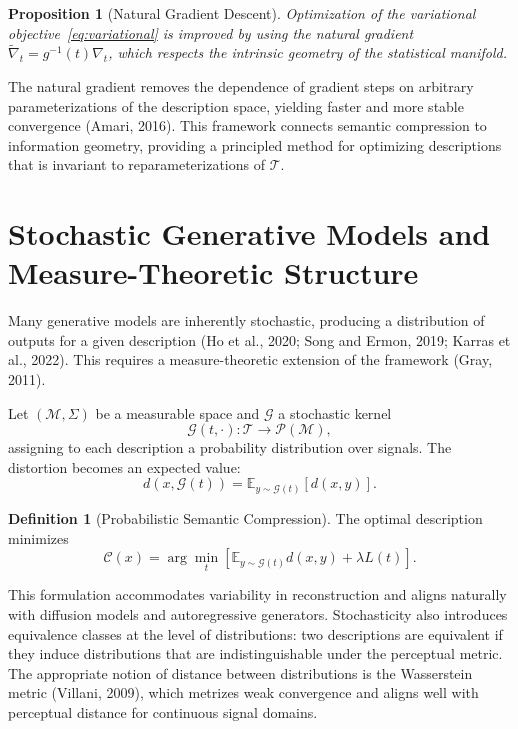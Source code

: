 \documentclass[11pt,a4paper]{article}
\newtheorem{proposition}[theorem]{Proposition}
\theoremstyle{definition}
\newtheorem{definition}[theorem]{Definition}
\theoremstyle{remark}
\begin{document}
\begin{proposition}[Natural Gradient Descent]
Optimization of the variational objective~\eqref{eq:variational} is improved by using the natural gradient $\tilde{\nabla}_t = g^{-1}(t) \nabla_t$, which respects the intrinsic geometry of the statistical manifold.
\end{proposition}

The natural gradient removes the dependence of gradient steps on arbitrary parameterizations of the description space, yielding faster and more stable convergence (Amari, 2016). This framework connects semantic compression to information geometry, providing a principled method for optimizing descriptions that is invariant to reparameterizations of $\mathcal{T}$.

\section{Stochastic Generative Models and Measure-Theoretic Structure}
\label{sec:stochastic}

Many generative models are inherently stochastic, producing a distribution of outputs for a given description (Ho et al., 2020; Song and Ermon, 2019; Karras et al., 2022). This requires a measure-theoretic extension of the framework (Gray, 2011).

Let $(\mathcal{M}, \Sigma)$ be a measurable space and $\mathcal{G}$ a stochastic kernel
\[
\mathcal{G}(t, \cdot) : \mathcal{T} \to \mathcal{P}(\mathcal{M}),
\]
assigning to each description a probability distribution over signals. The distortion becomes an expected value:
\[
d(x, \mathcal{G}(t)) = \mathbb{E}_{y \sim \mathcal{G}(t)}[d(x,y)].
\]

\begin{definition}[Probabilistic Semantic Compression]
The optimal description minimizes
\[
\mathcal{C}(x) = \arg\min_t \left[ \mathbb{E}_{y \sim \mathcal{G}(t)} d(x,y) + \lambda L(t) \right].
\]
\end{definition}

This formulation accommodates variability in reconstruction and aligns naturally with diffusion models and autoregressive generators. Stochasticity also introduces equivalence classes at the level of distributions: two descriptions are equivalent if they induce distributions that are indistinguishable under the perceptual metric. The appropriate notion of distance between distributions is the Wasserstein metric (Villani, 2009), which metrizes weak convergence and aligns well with perceptual distance for continuous signal domains.
\end{document}
